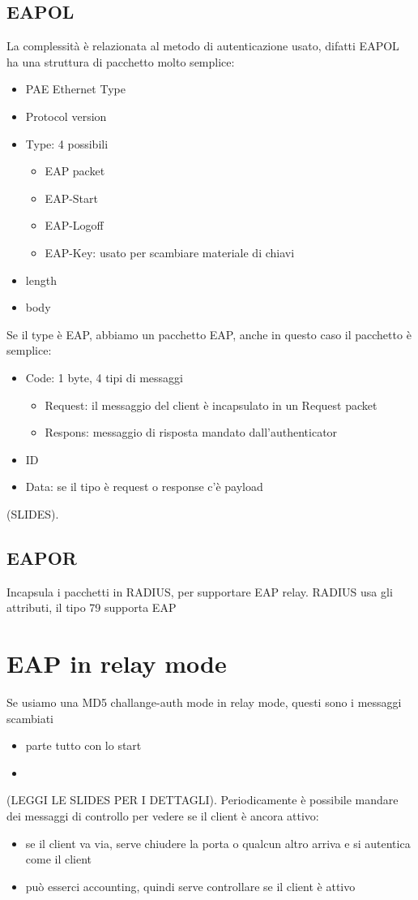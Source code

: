 \documentclass[12pt, oneside]{extbook} %
\begin{document}
\subsection{EAPOL}
La complessità è relazionata al metodo di autenticazione usato, difatti EAPOL ha una struttura di pacchetto molto semplice:
\begin{itemize}
\item PAE Ethernet Type
\item Protocol version
\item Type: 4 possibili
\begin{itemize}
\item EAP packet
\item EAP-Start
\item EAP-Logoff
\item EAP-Key: usato per scambiare materiale di chiavi
\end{itemize}
\item length
\item body
\end{itemize}
Se il type è EAP, abbiamo un pacchetto EAP, anche in questo caso il pacchetto è semplice:
\begin{itemize}
\item Code: 1 byte, 4 tipi di messaggi
\begin{itemize}
\item Request: il messaggio del client è incapsulato in un Request packet
\item Respons: messaggio di risposta mandato dall'authenticator
\end{itemize}
\item ID
\item Data: se il tipo è request o response c'è payload 
\end{itemize}
(SLIDES).
\subsection{EAPOR}
Incapsula i pacchetti in RADIUS, per supportare EAP relay. RADIUS usa gli attributi, il tipo 79 supporta EAP
\section{EAP in relay mode}
Se usiamo una MD5 challange-auth mode in relay mode, questi sono i messaggi scambiati
\begin{itemize}
\item parte tutto con lo start
\item 
\end{itemize}
(LEGGI LE SLIDES PER I DETTAGLI). Periodicamente è possibile mandare dei messaggi di controllo per vedere se il client è ancora attivo:
\begin{itemize}
\item se il client va via, serve chiudere la porta o qualcun altro arriva e si autentica come il client
\item può esserci accounting, quindi serve controllare se il client è attivo
\end{itemize}
\end{document}
